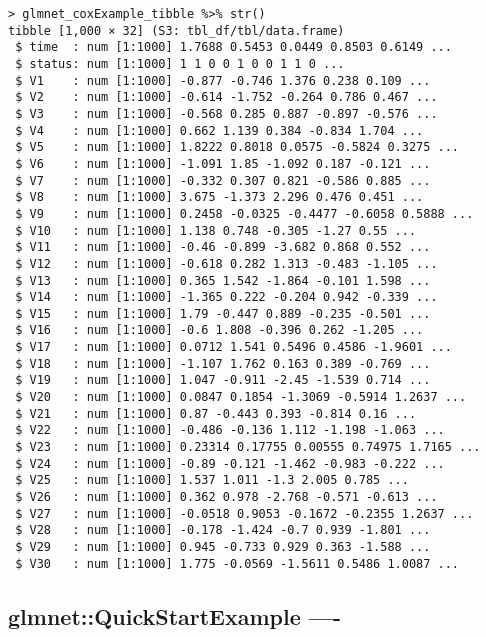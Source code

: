 \documentclass[
]{article}
\begin{document}
\begin{verbatim}
> glmnet_coxExample_tibble %>% str()
tibble [1,000 × 32] (S3: tbl_df/tbl/data.frame)
 $ time  : num [1:1000] 1.7688 0.5453 0.0449 0.8503 0.6149 ...
 $ status: num [1:1000] 1 1 0 0 1 0 0 1 1 0 ...
 $ V1    : num [1:1000] -0.877 -0.746 1.376 0.238 0.109 ...
 $ V2    : num [1:1000] -0.614 -1.752 -0.264 0.786 0.467 ...
 $ V3    : num [1:1000] -0.568 0.285 0.887 -0.897 -0.576 ...
 $ V4    : num [1:1000] 0.662 1.139 0.384 -0.834 1.704 ...
 $ V5    : num [1:1000] 1.8222 0.8018 0.0575 -0.5824 0.3275 ...
 $ V6    : num [1:1000] -1.091 1.85 -1.092 0.187 -0.121 ...
 $ V7    : num [1:1000] -0.332 0.307 0.821 -0.586 0.885 ...
 $ V8    : num [1:1000] 3.675 -1.373 2.296 0.476 0.451 ...
 $ V9    : num [1:1000] 0.2458 -0.0325 -0.4477 -0.6058 0.5888 ...
 $ V10   : num [1:1000] 1.138 0.748 -0.305 -1.27 0.55 ...
 $ V11   : num [1:1000] -0.46 -0.899 -3.682 0.868 0.552 ...
 $ V12   : num [1:1000] -0.618 0.282 1.313 -0.483 -1.105 ...
 $ V13   : num [1:1000] 0.365 1.542 -1.864 -0.101 1.598 ...
 $ V14   : num [1:1000] -1.365 0.222 -0.204 0.942 -0.339 ...
 $ V15   : num [1:1000] 1.79 -0.447 0.889 -0.235 -0.501 ...
 $ V16   : num [1:1000] -0.6 1.808 -0.396 0.262 -1.205 ...
 $ V17   : num [1:1000] 0.0712 1.541 0.5496 0.4586 -1.9601 ...
 $ V18   : num [1:1000] -1.107 1.762 0.163 0.389 -0.769 ...
 $ V19   : num [1:1000] 1.047 -0.911 -2.45 -1.539 0.714 ...
 $ V20   : num [1:1000] 0.0847 0.1854 -1.3069 -0.5914 1.2637 ...
 $ V21   : num [1:1000] 0.87 -0.443 0.393 -0.814 0.16 ...
 $ V22   : num [1:1000] -0.486 -0.136 1.112 -1.198 -1.063 ...
 $ V23   : num [1:1000] 0.23314 0.17755 0.00555 0.74975 1.7165 ...
 $ V24   : num [1:1000] -0.89 -0.121 -1.462 -0.983 -0.222 ...
 $ V25   : num [1:1000] 1.537 1.011 -1.3 2.005 0.785 ...
 $ V26   : num [1:1000] 0.362 0.978 -2.768 -0.571 -0.613 ...
 $ V27   : num [1:1000] -0.0518 0.9053 -0.1672 -0.2355 1.2637 ...
 $ V28   : num [1:1000] -0.178 -1.424 -0.7 0.939 -1.801 ...
 $ V29   : num [1:1000] 0.945 -0.733 0.929 0.363 -1.588 ...
 $ V30   : num [1:1000] 1.775 -0.0569 -1.5611 0.5486 1.0087 ...
\end{verbatim}

\hypertarget{glmnetquickstartexample--}{%
\subsection{glmnet::QuickStartExample
----}\label{glmnetquickstartexample--}}
\end{document}
